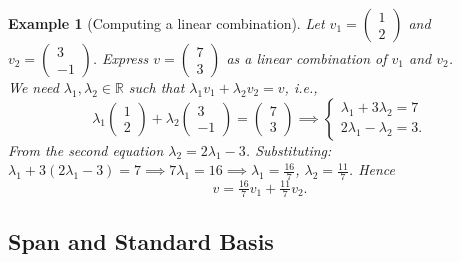 \documentclass{article}
\newtheorem*{example}{Example}
\begin{document}
\begin{example}[Computing a linear combination]
    Let $v_1=\begin{pmatrix}1\\2\end{pmatrix}$ and $v_2=\begin{pmatrix}3\\-1\end{pmatrix}$. Express $v=\begin{pmatrix}7\\3\end{pmatrix}$ as a linear combination of $v_1$ and $v_2$.\\
    We need $\lambda_1,\lambda_2\in\mathbb{R}$ such that $\lambda_1v_1+\lambda_2v_2=v$, i.e.,
    \[\lambda_1\begin{pmatrix}1\\2\end{pmatrix}+\lambda_2\begin{pmatrix}3\\-1\end{pmatrix}=\begin{pmatrix}7\\3\end{pmatrix} \implies \begin{cases}\lambda_1+3\lambda_2=7\\2\lambda_1-\lambda_2=3.\end{cases}\]
    From the second equation $\lambda_2=2\lambda_1-3$. Substituting: $\lambda_1+3(2\lambda_1-3)=7\implies 7\lambda_1=16\implies\lambda_1=\tfrac{16}{7}$, $\lambda_2=\tfrac{11}{7}$. Hence
    \[v = \tfrac{16}{7}v_1+\tfrac{11}{7}v_2.\]
\end{example}

\subsection{Span and Standard Basis}
\end{document}
